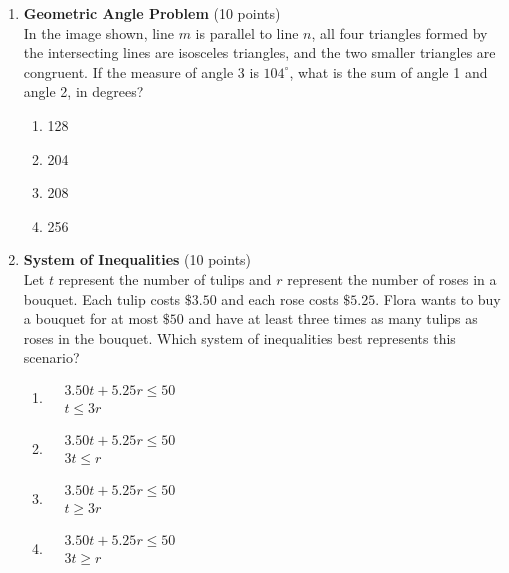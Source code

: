 \begin{enumerate}
  \newpage

  \item \textbf{Geometric Angle Problem} (10 points)\\
  In the image shown, line $m$ is parallel to line $n$, all four triangles formed by the intersecting lines are isosceles triangles, and the two smaller triangles are congruent. If the measure of angle 3 is $104^{\circ}$, what is the sum of angle 1 and angle 2, in degrees?
  \begin{enumerate}[label=(\Alph*)]
    \item 128
    \item 204
    \item 208
    \item 256
  \end{enumerate}
  \begin{subanswer}
  \end{subanswer}



  \item \textbf{System of Inequalities} (10 points)\\
  Let $t$ represent the number of tulips and $r$ represent the number of roses in a bouquet. Each tulip costs $\$3.50$ and each rose costs $\$5.25$. Flora wants to buy a bouquet for at most $\$50$ and have at least three times as many tulips as roses in the bouquet. Which system of inequalities best represents this scenario?
  \begin{enumerate}[label=(\Alph*)]
    \item $\begin{aligned} & 3.50 t+5.25 r \leq 50 \\ & t \leq 3 r \end{aligned}$
    \item $\begin{aligned} & 3.50 t+5.25 r \leq 50 \\ & 3 t \leq r \end{aligned}$
    \item $\begin{aligned} & 3.50 t+5.25 r \leq 50 \\ & t \geq 3 r \end{aligned}$
    \item $\begin{aligned} & 3.50 t+5.25 r \leq 50 \\ & 3 t \geq r \end{aligned}$
  \end{enumerate}
  \begin{subanswer}
  \end{subanswer}



\end{enumerate}
